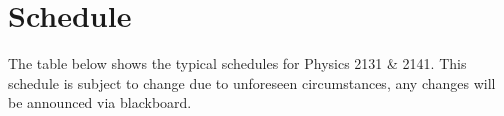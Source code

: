 \section*{Schedule}
The table below shows the typical schedules for Physics 2131 \& 2141.
This schedule is subject to change due to unforeseen circumstances, any changes will be announced via blackboard.

